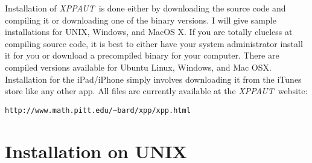 \documentclass{article}
\newcommand{\XPP}{{\sl XPPAUT\, }}
\begin{document}
Installation of \XPP is done either by
downloading the source code and compiling it or downloading one of the
binary versions. I will give sample installations for UNIX, 
Windows, and MacOS X. 
 If you are totally clueless at compiling source code, it is best to
either have your system administrator install it for you or download a
precompiled binary for your computer. There are compiled versions
available for Ubuntu Linux, Windows, and Mac OSX. Installation for the
iPad/iPhone simply involves downloading it from the iTunes store like any
other app. All files are currently available at the \XPP website: 
\begin{verbatim}
http://www.math.pitt.edu/~bard/xpp/xpp.html
\end{verbatim} 
\section{Installation on UNIX} 
\end{document}
